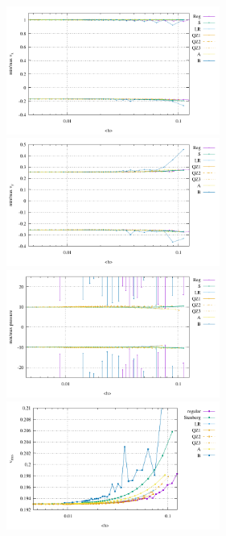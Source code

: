 \begin{center}
\includegraphics[width=7cm]{python_codes/fieldstone_78/results/ldc/ustats}
\includegraphics[width=7cm]{python_codes/fieldstone_78/results/ldc/vstats}\\
\includegraphics[width=7cm]{python_codes/fieldstone_78/results/ldc/pstats.pdf}
\includegraphics[width=7cm]{python_codes/fieldstone_78/results/ldc/vrms.pdf}
\end{center}

